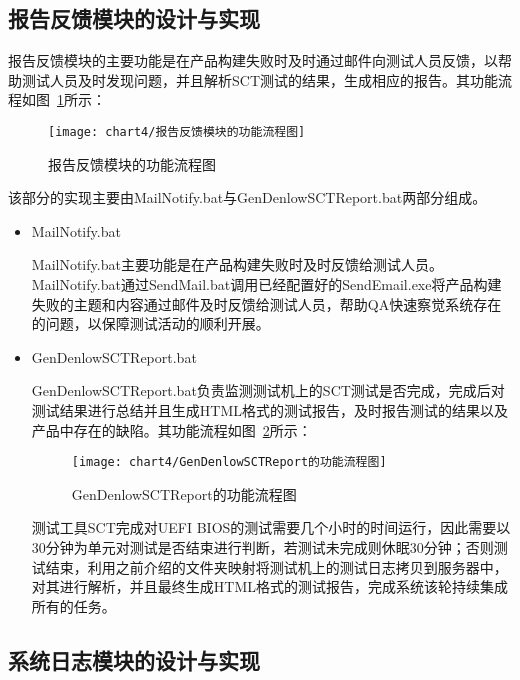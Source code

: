 	\subsection{报告反馈模块的设计与实现}
		
		报告反馈模块的主要功能是在产品构建失败时及时通过邮件向测试人员反馈，以帮助测试人员及时发现问题，并且解析SCT测试的结果，生成相应的报告。其功能流程如图~\ref{fig:报告反馈模块的功能流程图}所示：
		
			\begin{figure}[H] %
				\centering
				\texttt{[image: chart4/报告反馈模块的功能流程图]}
				\caption{报告反馈模块的功能流程图}
				\label{fig:报告反馈模块的功能流程图}
			\end{figure}
		
		该部分的实现主要由MailNotify.bat与GenDenlowSCTReport.bat两部分组成。
		
		\begin{itemize}
			\item MailNotify.bat
				
				MailNotify.bat主要功能是在产品构建失败时及时反馈给测试人员。MailNotify.bat通过SendMail.bat调用已经配置好的SendEmail.exe将产品构建失败的主题和内容通过邮件及时反馈给测试人员，帮助QA快速察觉系统存在的问题，以保障测试活动的顺利开展。
			\item GenDenlowSCTReport.bat
				
				GenDenlowSCTReport.bat负责监测测试机上的SCT测试是否完成，完成后对测试结果进行总结并且生成HTML格式的测试报告，及时报告测试的结果以及产品中存在的缺陷。其功能流程如图~\ref{fig:GenDenlowSCTReport的功能流程图}所示：
				
				\begin{figure}[H] %
					\centering
					\texttt{[image: chart4/GenDenlowSCTReport的功能流程图]}
					\caption{GenDenlowSCTReport的功能流程图}
					\label{fig:GenDenlowSCTReport的功能流程图}
				\end{figure}
				
				测试工具SCT完成对UEFI BIOS的测试需要几个小时的时间运行，因此需要以30分钟为单元对测试是否结束进行判断，若测试未完成则休眠30分钟；否则测试结束，利用之前介绍的文件夹映射将测试机上的测试日志拷贝到服务器中，对其进行解析，并且最终生成HTML格式的测试报告，完成系统该轮持续集成所有的任务。
		\end{itemize}
	
	\subsection{系统日志模块的设计与实现}
		
